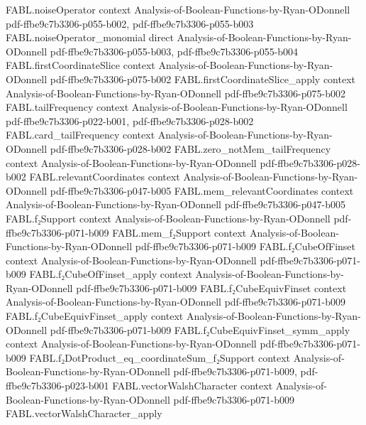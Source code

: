\begin{theorem}
\proofstep
  {FABL.noiseOperator}
  {context}
  {Analysis-of-Boolean-Functions-by-Ryan-ODonnell}
  {pdf-ffbe9c7b3306-p055-b002,
    pdf-ffbe9c7b3306-p055-b003}
\proofstep
  {FABL.noiseOperator_monomial}
  {direct}
  {Analysis-of-Boolean-Functions-by-Ryan-ODonnell}
  {pdf-ffbe9c7b3306-p055-b003,
    pdf-ffbe9c7b3306-p055-b004}
\proofstep
  {FABL.firstCoordinateSlice}
  {context}
  {Analysis-of-Boolean-Functions-by-Ryan-ODonnell}
  {pdf-ffbe9c7b3306-p075-b002}
\proofstep
  {FABL.firstCoordinateSlice_apply}
  {context}
  {Analysis-of-Boolean-Functions-by-Ryan-ODonnell}
  {pdf-ffbe9c7b3306-p075-b002}
\proofstep
  {FABL.tailFrequency}
  {context}
  {Analysis-of-Boolean-Functions-by-Ryan-ODonnell}
  {pdf-ffbe9c7b3306-p022-b001,
    pdf-ffbe9c7b3306-p028-b002}
\proofstep
  {FABL.card_tailFrequency}
  {context}
  {Analysis-of-Boolean-Functions-by-Ryan-ODonnell}
  {pdf-ffbe9c7b3306-p028-b002}
\proofstep
  {FABL.zero_notMem_tailFrequency}
  {context}
  {Analysis-of-Boolean-Functions-by-Ryan-ODonnell}
  {pdf-ffbe9c7b3306-p028-b002}
\proofstep
  {FABL.relevantCoordinates}
  {context}
  {Analysis-of-Boolean-Functions-by-Ryan-ODonnell}
  {pdf-ffbe9c7b3306-p047-b005}
\proofstep
  {FABL.mem_relevantCoordinates}
  {context}
  {Analysis-of-Boolean-Functions-by-Ryan-ODonnell}
  {pdf-ffbe9c7b3306-p047-b005}
\proofstep
  {FABL.f₂Support}
  {context}
  {Analysis-of-Boolean-Functions-by-Ryan-ODonnell}
  {pdf-ffbe9c7b3306-p071-b009}
\proofstep
  {FABL.mem_f₂Support}
  {context}
  {Analysis-of-Boolean-Functions-by-Ryan-ODonnell}
  {pdf-ffbe9c7b3306-p071-b009}
\proofstep
  {FABL.f₂CubeOfFinset}
  {context}
  {Analysis-of-Boolean-Functions-by-Ryan-ODonnell}
  {pdf-ffbe9c7b3306-p071-b009}
\proofstep
  {FABL.f₂CubeOfFinset_apply}
  {context}
  {Analysis-of-Boolean-Functions-by-Ryan-ODonnell}
  {pdf-ffbe9c7b3306-p071-b009}
\proofstep
  {FABL.f₂CubeEquivFinset}
  {context}
  {Analysis-of-Boolean-Functions-by-Ryan-ODonnell}
  {pdf-ffbe9c7b3306-p071-b009}
\proofstep
  {FABL.f₂CubeEquivFinset_apply}
  {context}
  {Analysis-of-Boolean-Functions-by-Ryan-ODonnell}
  {pdf-ffbe9c7b3306-p071-b009}
\proofstep
  {FABL.f₂CubeEquivFinset_symm_apply}
  {context}
  {Analysis-of-Boolean-Functions-by-Ryan-ODonnell}
  {pdf-ffbe9c7b3306-p071-b009}
\proofstep
  {FABL.f₂DotProduct_eq_coordinateSum_f₂Support}
  {context}
  {Analysis-of-Boolean-Functions-by-Ryan-ODonnell}
  {pdf-ffbe9c7b3306-p071-b009,
    pdf-ffbe9c7b3306-p023-b001}
\proofstep
  {FABL.vectorWalshCharacter}
  {context}
  {Analysis-of-Boolean-Functions-by-Ryan-ODonnell}
  {pdf-ffbe9c7b3306-p071-b009}
\proofstep
  {FABL.vectorWalshCharacter_apply}

\end{theorem}
